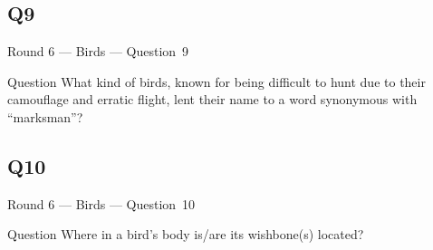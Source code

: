 \documentclass[11pt]{beamer}
\begin{document}
\subsection*{Q9}
\begin{frame}[t]{Round 6 --- Birds --- \mbox{Question 9}}
    \vspace{-0.5em}
    \begin{block}{Question}
        What kind of birds, known for being difficult to hunt due to their camouflage and erratic flight, lent their name to a word synonymous with ``marksman''?
    \end{block}
\end{frame}
\subsection*{Q10}
\begin{frame}[t]{Round 6 --- Birds --- \mbox{Question 10}}
    \vspace{-0.5em}
    \begin{block}{Question}
        Where in a bird's body is/are its wishbone(s) located?
    \end{block}
\end{frame}
\end{document}
